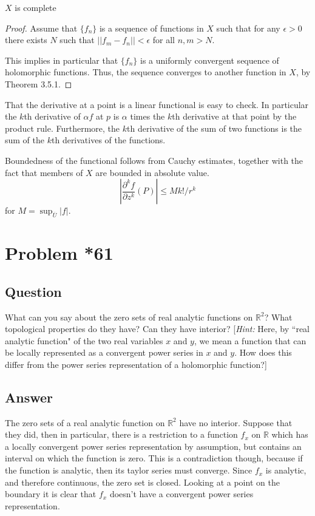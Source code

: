 \documentclass[11pt]{article}
\begin{document}
$X$ is complete
\begin{proof}
Assume that $\{f_n\}$ is a sequence of functions in $X$ such that for any $\epsilon >0$ there exists $N$ such that $||f_m - f_n||< \epsilon$ for all $n,m > N$.

This implies in particular that $\{f_n\}$ is a uniformly convergent sequence of holomorphic functions. Thus, the sequence converges to another function in $X$, by Theorem 3.5.1.
\end{proof}

That the derivative at a point is a linear functional is easy to check. In particular the $k$th derivative of $\alpha f$ at $p$ is $\alpha$ times the $k$th derivative at that point by the product rule. Furthermore, the $k$th derivative of the sum of two functions is the sum of the $k$th derivatives of the functions. 

Boundedness of the functional follows from Cauchy estimates, together with the fact that members of $X$ are bounded in absolute value. 
\[\left| \frac{\partial^k f}{\partial z^k} (P) \right| \leq M k! / r^k\]
for $M = \sup_{\overline{U}} |f|$.

\section{Problem *61}
\subsection{Question}
What can you say about the zero sets of real analytic functions on $\mathbb{R}^2$? What topological properties do they have? Can they have interior? [\emph{Hint:} Here, by ``real analytic function" of the two real variables $x$ and $y$, we mean a function that can be locally represented as a convergent power series in $x$ and $y$. How does this differ from the power series representation of a holomorphic function?]
\subsection{Answer}
The zero sets of a real analytic function on $\mathbb{R}^2$ have no interior. Suppose that they did, then in particular, there is a restriction to a function $f_x$ on $\mathbb{R}$ which has a locally convergent power series representation by assumption, but contains an interval on which the function is zero. This is a contradiction though, because if the function is analytic, then its taylor series must converge. Since $f_x$ is analytic, and therefore continuous, the zero set is closed. Looking at a point on the boundary it is clear that $f_x$ doesn't have a convergent power series representation. 
\end{document}
